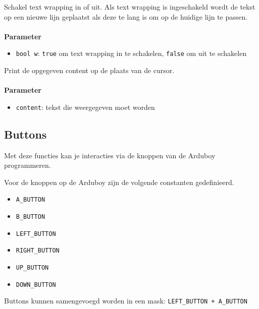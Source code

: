 \documentclass[11pt,fleqn]{book} %
\begin{document}
\begin{libf}[setTextWrap(w)]
	Schakel text wrapping in of uit. Als text wrapping is ingeschakeld wordt de tekst op een nieuwe lijn geplaatst als deze te lang is om op de huidige lijn te passen.\\ \\
	\textbf{Parameter}
	\begin{itemize}
		\item \texttt{bool w}: \texttt{true} om text wrapping in te schakelen, \texttt{false} om uit te schakelen
	\end{itemize}
\end{libf}

\begin{libf}
	Print de opgegeven content op de plaats van de cursor.\\ \\
	\textbf{Parameter}
	\begin{itemize}
		\item \texttt{content}: tekst die weergegeven moet worden
	\end{itemize}
\end{libf}

\subsection{Buttons}
Met deze functies kan je interacties via de knoppen van de Arduboy programmeren.

\begin{libf}
	Voor de knoppen op de Arduboy zijn de volgende constanten gedefinieerd.
	\begin{multicols}{3}
		\begin{itemize}
			\item \texttt{A\_BUTTON}
			\item \texttt{B\_BUTTON}
			\item \texttt{LEFT\_BUTTON}
			\item \texttt{RIGHT\_BUTTON}
			\item \texttt{UP\_BUTTON}
			\item \texttt{DOWN\_BUTTON}
		\end{itemize}
	\end{multicols}

	Buttons kunnen samengevoegd worden in een mask: \texttt{LEFT\_BUTTON + A\_BUTTON}
\end{libf}
\end{document}
